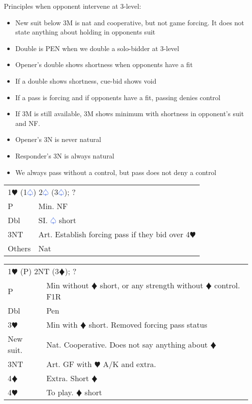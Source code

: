 \documentclass{article}
\renewcommand{\sp}{\textcolor{RoyalBlue}{$\varspade$}}
\newcommand{\he}{\textcolor{RubineRed}{$\varheart$}}
\newcommand{\di}{\textcolor{Peach}{$\vardiamond$}}
\newcommand{\nt}{\relsize{-1}NT\relsize{1}}
\begin{document}
Principles when opponent intervene at 3-level:
\begin{itemize}
	\itemsep0em
	\item New suit below 3M is nat and cooperative, but not game forcing. It does not state anything about holding in opponents suit
	\item Double is PEN when we double a solo-bidder at 3-level
	\item Opener's double shows shortness when opponents have a fit
	\item If a double shows shortness, cue-bid shows void
	\item If a pass is forcing and if opponents have a fit, passing denies control
	\item If 3M is still available, 3M shows minimum with shortness in opponent's suit and NF.
	\item Opener's 3N is never natural
	\item Responder's 3N is always natural
	\item We always pass without a control, but pass does not deny a control
\end{itemize}

\begin{tabular}{|l|p{6.5cm}}
	\multicolumn{2}{l}{1\he{} (1\sp{}) 2\sp{} (3\sp{}); ? }\\
	P & Min. NF \\
	Dbl & SI. \sp{} short \\
	3\nt{} & Art. Establish forcing pass if they bid over 4\he{} \\
	Others & Nat \\
\end{tabular}

\medskip

\begin{tabular}{|l|p{6.5cm}}
	\multicolumn{2}{l}{1\he{} (P) 2\nt{} (3\di{}); ? }\\
	P & Min without \di{} short, or any strength without \di{} control. F1R \\
	Dbl & Pen \\
	3\he{} & Min with \di{} short. Removed forcing pass status \\
	New suit. & Nat. Cooperative. Does not say anything about \di{} \\
	3\nt{} & Art. GF with \he{} A/K and extra. \\
	4\di{} & Extra. Short \di{} \\
	4\he{} & To play. \di{} short \\
\end{tabular}
\end{document}
